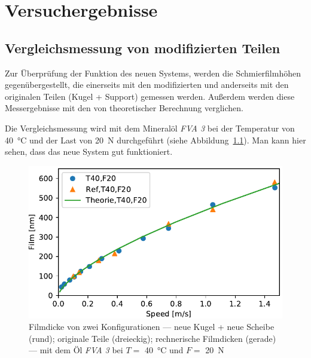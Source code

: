 \chapter{Versuchergebnisse}
\label{chap:versuchergenisse}

\section{Vergleichsmessung von modifizierten Teilen}
\label{sec:vergleichsmessung_von_difizierten_Teilen}

Zur Überprüfung der Funktion des neuen Systems, werden die Schmierfilmhöhen gegenübergestellt, die einerseits mit den modifizierten und anderseits mit den originalen Teilen (Kugel + Support) gemessen werden.
Außerdem werden diese Messergebnisse mit den von theoretischer Berechnung verglichen.

Die Vergleichsmessung wird mit dem Mineralöl \textit{FVA 3} bei der Temperatur von \SI{40}{\degreeCelsius} und der Last von \SI{20}{\N} durchgeführt (siehe Abbildung~\ref{fig:vergleichsmessung}).
Man kann hier sehen, dass das neue System gut funktioniert.

\begin{figure}[htb]
    \centering
    \includegraphics[]{./images/vergleichsmessung_T40_F20_FVA3.pdf}
    \caption{Filmdicke von zwei Konfigurationen --- neue Kugel + neue Scheibe (rund); originale Teile (dreieckig); rechnerische Filmdicken (gerade) --- mit dem Öl \textit{FVA 3} bei $T =$ \SI{40}{\degreeCelsius} und $F =$ \SI{20}{\N}}
    \label{fig:vergleichsmessung}
\end{figure}

